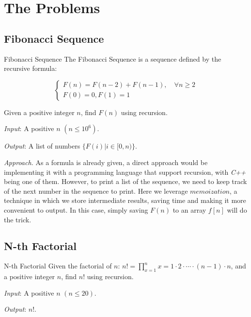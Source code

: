 \documentclass{article}
\begin{document}
    \section{The Problems}



    \subsection{Fibonacci Sequence}

    \begin{statement*}{Fibonacci Sequence}{}
        The Fibonacci Sequence is a sequence defined by the recursive formula:

        \begin{equation*}
            \begin{cases}
                F(n) = F(n - 2) + F(n - 1), \quad \forall n \ge 2 \\
                F(0) = 0, F(1) = 1
            \end{cases}
        \end{equation*}

        Given a positive integer $n$, find $F(n)$ using recursion.

        \emph{Input}: A positive $n$ $(n \le 10^6)$.

        \emph{Output}: A list of numbers $\{F(i) | i \in [0, n)\}$.
    \end{statement*}

    \emph{Approach.} As a formula is already given, a direct approach would be implementing it with a programming language that support recursion, with \emph{C++} being one of them. However, to print a list of the sequence, we need to keep track of the next number in the sequence to print. Here we leverage $memoization$, a technique in which we store intermediate results, saving time and making it more convenient to output. In this case, simply saving $F(n)$ to an array $f[n]$ will do the trick.

    \subsection{N-th Factorial}

    \begin{statement*}{N-th Factorial}{}
        Given the factorial of $n$: $n! = \prod_{x=1}^{n} x = 1 \cdot 2 \cdot \cdots \cdot (n - 1) \cdot n$, and a positive integer $n$, find $n!$ using recursion.
        
        \emph{Input}: A positive $n$ $(n \le 20)$.

        \emph{Output}: $n!$.
    \end{statement*}
\end{document}
